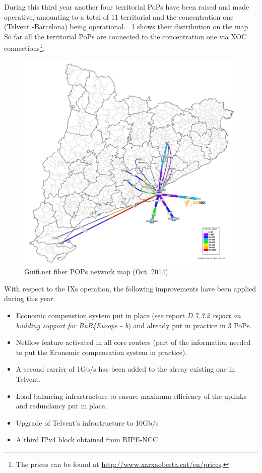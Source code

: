 During this third year another four territorial PoPs have been raised and made operative, amounting to a total of 11 territorial and the concentration one (Telvent -Barcelona) being operational. \figurename~\ref{fig:pop_weathermap} shows their distribution on the map. So far all the territorial PoPs are connected to the concentration one via XOC connections\footnote{The prices can be found at \url{http://www.xarxaoberta.cat/en/prices}.}.

\begin{figure}[H]
  \centering
  \includegraphics[width=0.95\linewidth]{sect3/figures/weathermap.jpg} 
  \caption[Guifi.net fiber POPs network map (Oct. 2014)]{Guifi.net fiber POPs network map (Oct. 2014).}
  \label{fig:pop_weathermap}
\end{figure}

With respect to the IXs operation, the following improvements have been applied during this year:
\begin{itemize}
  \item Economic compenstion system put in place (see report \emph{D.7.3.2 report on building support for BuB4Europe - b}) and already put in practice in 3 PoPs.
  \item Netflow feature activated in all core routers (part of the information needed to put the Economic compensation system in practice).
  \item A second carrier of 1Gb/s has been added to the alreay existing one in Telvent.
  \item Load balancing infrastructure to ensure maximum efficiency of the uplinks and redundancy put in place.
  \item Upgrade of Telvent's infrastructure to 10Gb/s
  \item A third IPv4 block obtained from RIPE-NCC
\end{itemize}

